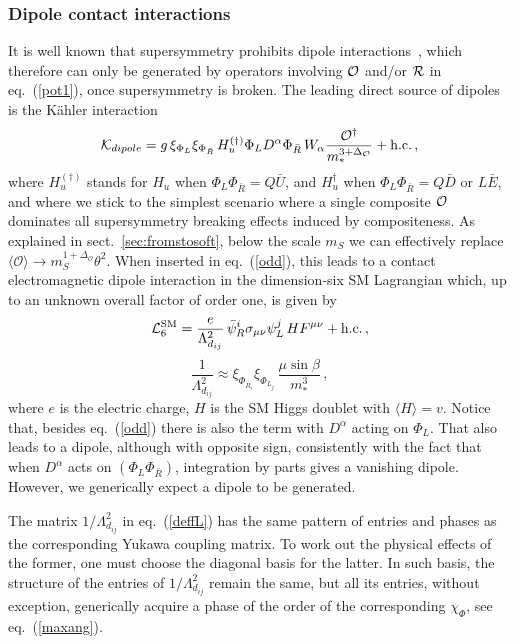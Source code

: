 \documentclass[a4paper,12pt]{article}
\newcommand{\hc}{{\rm h.c.}}
\newcommand{\beq}{\begin{equation}}
\newcommand{\eeq}{\end{equation}}
\def\eq#1{eq.~(\ref{#1})}
\def\eq#1{eq.~(\ref{#1})}
\def\sec#1{sect.~\ref{#1}}
\def\O{\mathcal{O}}
\def\mst{m_*}
\def\mS{m_S}
\begin{document}
\boldmath
\subsubsection*{Dipole contact interactions}
\unboldmath

It is well known that supersymmetry prohibits dipole interactions~\cite{Ferrara:1974wb}, which therefore can
only be generated by operators involving ${\cal O}$ and/or ${\cal R}$ in \eq{pot1}, once supersymmetry is broken.
The leading direct source  of dipoles  is the K\"ahler interaction 
\beq
{\cal K}_{dipole} =  g\, 
\xi_{\Phi_L} \xi_{\Phi_{\bar R}} \, H_u^{(\dagger)} \Phi_L { D}^{\alpha}\Phi_{\bar R}
  \,{ W}_\alpha \frac{\O^\dagger}{\mst^{3+\Delta_{\O}}} + \hc \, ,
\label{odd}
\eeq
where $H_u^{(\dagger)}$ stands for $H_u$ when $\Phi_L \Phi_{\bar R} = Q {\bar U}$, and $H_u^\dagger$ when $\Phi_L \Phi_{\bar R} = Q {\bar D}$ or $L {\bar E}$, and where we stick to the simplest scenario where a single composite ${\cal O}$ dominates all supersymmetry breaking effects induced by compositeness.
As explained in \sec{sec:fromstosoft}, below the scale $\mS$ we can effectively replace $\langle \O\rangle\to \mS^{1+\Delta_{\O}}\theta^2$. When inserted in \eq{odd}, this leads to a contact electromagnetic dipole interaction in the dimension-six SM Lagrangian which, up to an unknown overall factor of order one, is given by
\beq
{\cal L}^{\rm SM}_6=
\frac{e}{ \Lambda_{d_{ij}}^2}\, {\bar \psi}_R^i \sigma_{\mu \nu} \psi_L^j \, H F^{\mu \nu} + \hc  \, ,
\label{dipolec}
\eeq
\beq
\frac{1}{\Lambda_{d_{ij}}^2}\approx {\xi_{\Phi_{{\bar R}_i}} \xi_{\Phi_{L_j}}}\, \frac{\mu\sin\beta}{\mst^3} \, ,
\label{deffL}
\eeq
where $e$ is the electric charge, $H$ is the SM Higgs doublet with $\langle H\rangle =v$. Notice that, besides \eq{odd} there is also the term with $D^\alpha$ acting on $\Phi_L $. That also leads to a dipole, although with opposite sign, consistently with the fact that when $D^\alpha$ acts on $(\Phi_L \Phi_{\bar R})$,  integration by parts gives a vanishing   dipole. However, we generically expect a dipole to be generated.


The matrix $1/{\Lambda_{d_{ij}}^2}$ in \eq{deffL} has the same pattern of entries and phases as the corresponding Yukawa coupling matrix. To work out the physical effects of the former, one must choose the diagonal basis for the latter. In such basis, the structure of the entries of $1/{\Lambda_{d_{ij}}^2}$ remain the same, but  all its entries, without exception, generically acquire a phase 
of the order of the corresponding $\chi_\Phi$, see \eq{maxang}.
\end{document}
